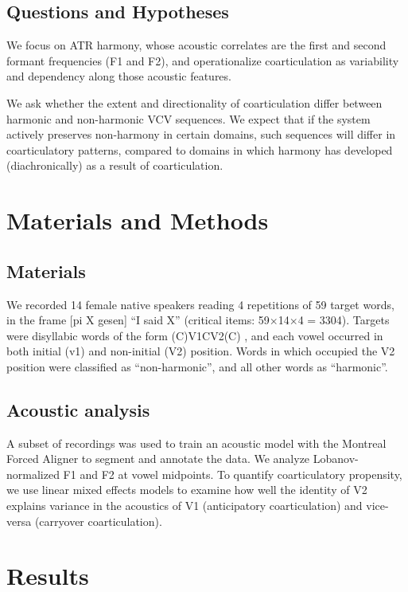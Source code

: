 \documentclass[a4paper,11pt,twocolumn]{article}
\newcommand{\wt}[1]{\textipa{/#1/}} %
\begin{document}
	
	\subsection{Questions and Hypotheses}
	
	We focus on ATR harmony, whose acoustic correlates are the first and second formant frequencies (F1 and F2), and operationalize coarticulation as variability and dependency along those acoustic features. 
	
	We ask whether the extent and directionality of coarticulation differ between harmonic and non-harmonic VCV sequences. We expect that if the system actively preserves non-harmony in certain domains, such sequences will differ in coarticulatory patterns, compared to domains in which harmony has developed (diachronically) as a result of coarticulation. 
	
	\section{Materials and Methods}
	
	\subsection{Materials}
	We recorded 14 female native speakers reading 4 repetitions of 59 target words, in the frame [pi X gesen] ``I said X'' (critical items: 59$\times$14$\times$4 = 3304). Targets were disyllabic words of the form (C)V1CV2(C) \cite{svantesson2005}, and each vowel occurred in both initial (v1) and non-initial (V2) position. Words in which \wt{i} occupied the V2 position were classified as ``non-harmonic'', and all other words as ``harmonic''.
	
	\subsection{Acoustic analysis}
	A subset of recordings was used to train an acoustic model with the Montreal Forced Aligner \cite{mcauliffe2017montreal} to segment and annotate the data. We analyze Lobanov-normalized F1 and F2 at vowel midpoints. To quantify coarticulatory propensity, we use linear mixed effects models to examine how well the identity of V2 explains variance in the acoustics of V1 (anticipatory coarticulation) and vice-versa (carryover coarticulation).
	
	\section{Results}
\end{document}
